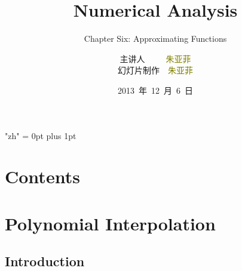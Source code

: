 \documentclass[notheorems,mathserif,table,compress]{beamer}  %
\begin{document}
\XeTeXlinebreaklocale "zh"         %
\XeTeXlinebreakskip = 0pt plus 1pt %


\title[Numerical Analysis]{Numerical Analysis}
\subtitle{Chapter Six: Approximating Functions}
\author[zhu]{主讲人~~~~~\textcolor{olive}{朱亚菲}\\
    \quad 幻灯片制作~~\textcolor{olive}{朱亚菲}}
\institute[中国海洋大学]{\small\textcolor{violet}{中国海洋大学~~信息科学与工程学院}}
\date{2013~年~12~月~6~日}
\frame{ \titlepage }
\section*{Contents}



\section{Polynomial Interpolation}

\subsection{Introduction}
\end{document}
